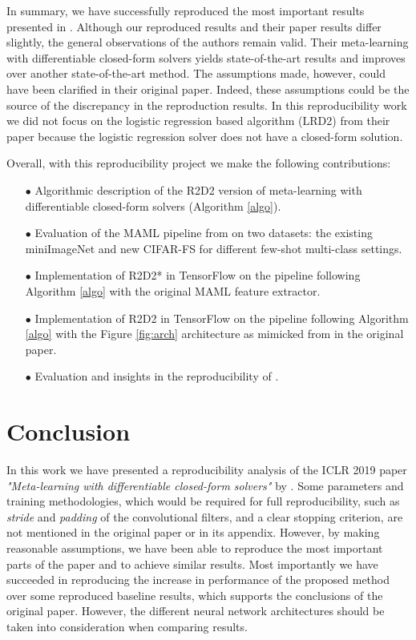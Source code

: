 In summary, we have successfully reproduced the most important results presented in \citet{R2D2}. Although our reproduced results and their paper results differ slightly, the general observations of the authors remain valid. Their meta-learning with differentiable closed-form solvers yields state-of-the-art results and improves over another state-of-the-art method. The assumptions made, however, could have been clarified in their original paper. Indeed, these assumptions could be the source of the discrepancy in the reproduction results. In this reproducibility work we did not focus on the logistic regression based algorithm (LRD2) from their paper because the logistic regression solver does not have a closed-form solution.

Overall, with this reproducibility project we make the following contributions:
\begin{itemize}
\item[$\bullet$] Algorithmic description of the R2D2 version of meta-learning with differentiable closed-form solvers (Algorithm \ref{algo}).
\item[$\bullet$] Evaluation of the MAML pipeline from \citet{MAML} on two  datasets: the existing miniImageNet and new \textsc{CIFAR-FS} for different few-shot multi-class settings.
\item[$\bullet$] Implementation of R2D2* in TensorFlow on the pipeline following Algorithm \ref{algo} with the original MAML feature extractor.
\item[$\bullet$] Implementation of R2D2 in TensorFlow on the pipeline following Algorithm \ref{algo} with the Figure \ref{fig:arch} architecture as mimicked from in the original paper\supercite{R2D2}.
\item[$\bullet$] Evaluation and insights in the reproducibility of \citet{R2D2}.
\end{itemize}

\section{Conclusion}
\label{conc}
In this work we have presented a reproducibility analysis of the ICLR 2019 paper \textit{"Meta-learning with differentiable closed-form solvers"} by \citet{R2D2}. Some parameters and training methodologies, which would be required for full reproducibility, such as \textit{stride} and \textit{padding} of the convolutional filters, and a clear stopping criterion, are not mentioned in the original paper or in its appendix\supercite{R2D2}. However, by making reasonable assumptions, we have been able to reproduce the most important parts of the paper and to achieve similar results. Most importantly we have succeeded in reproducing the increase in performance of the proposed method over some reproduced baseline results, which supports the conclusions of the original paper. However, the different neural network architectures should be taken into consideration when comparing results.
